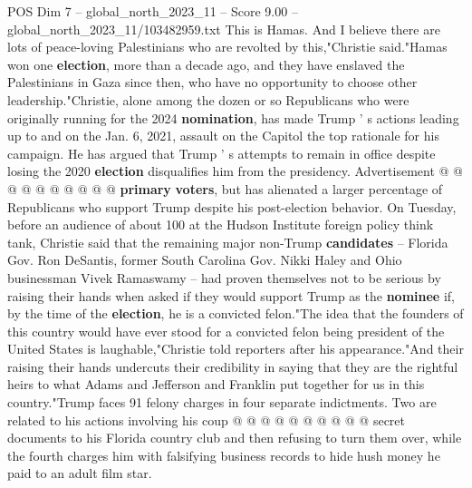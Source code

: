 \begin{textsample}{POS Dim 7 – global\_north\_2023\_11 – Score 9.00 – global\_north\_2023\_11/103482959.txt}
This is Hamas.
And I believe there are lots of peace-loving Palestinians who are revolted by this,"Christie said."Hamas won one \textbf{election}, more than a decade ago, and they have enslaved the Palestinians in Gaza since then, who have no opportunity to choose other leadership."Christie, alone among the dozen or so Republicans who were originally running for the 2024 \textbf{nomination}, has made Trump ' s actions leading up to and on the Jan. 6, 2021, assault on the Capitol the top rationale for his campaign.
He has argued that Trump ' s attempts to remain in office despite losing the 2020 \textbf{election} disqualifies him from the presidency.
Advertisement @ @ @ @ @ @ @ @ @ @ \textbf{primary} \textbf{voters}, but has alienated a larger percentage of Republicans who support Trump despite his post-election behavior.
On Tuesday, before an audience of about 100 at the Hudson Institute foreign policy think tank, Christie said that the remaining major non-Trump \textbf{candidates} -- Florida Gov.
Ron DeSantis, former South Carolina Gov.
Nikki Haley and Ohio businessman Vivek Ramaswamy -- had proven themselves not to be serious by raising their hands when asked if they would support Trump as the \textbf{nominee} if, by the time of the \textbf{election}, he is a convicted felon."The idea that the founders of this country would have ever stood for a convicted felon being president of the United States is laughable,"Christie told reporters after his appearance."And their raising their hands undercuts their credibility in saying that they are the rightful heirs to what Adams and Jefferson and Franklin put together for us in this country."Trump faces 91 felony charges in four separate indictments.
Two are related to his actions involving his coup @ @ @ @ @ @ @ @ @ @ secret documents to his Florida country club and then refusing to turn them over, while the fourth charges him with falsifying business records to hide hush money he paid to an adult film star.

\end{textsample}
